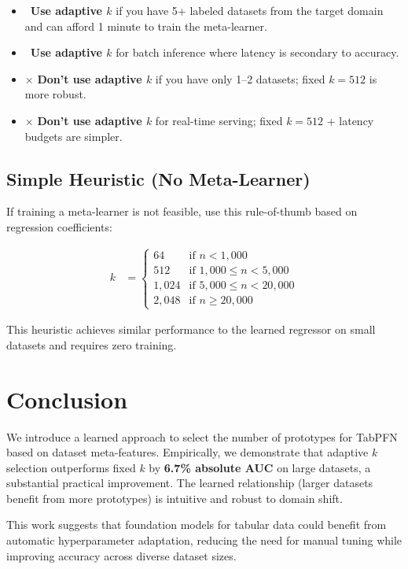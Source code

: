 \documentclass[11pt,a4paper]{article}
\begin{document}
\begin{itemize}
\item \checkmark\ \textbf{Use adaptive $k$} if you have 5+ labeled datasets from the target domain and can afford 1 minute to train the meta-learner.
\item \checkmark\ \textbf{Use adaptive $k$} for batch inference where latency is secondary to accuracy.
\item $\times$ \textbf{Don't use adaptive $k$} if you have only 1--2 datasets; fixed $k=512$ is more robust.
\item $\times$ \textbf{Don't use adaptive $k$} for real-time serving; fixed $k=512$ + latency budgets are simpler.
\end{itemize}

\subsection{Simple Heuristic (No Meta-Learner)}

If training a meta-learner is not feasible, use this rule-of-thumb based on regression coefficients:

\begin{align*}
k &= \begin{cases}
64 & \text{if } n < 1,000 \\
512 & \text{if } 1,000 \le n < 5,000 \\
1,024 & \text{if } 5,000 \le n < 20,000 \\
2,048 & \text{if } n \ge 20,000
\end{cases}
\end{align*}

This heuristic achieves similar performance to the learned regressor on small datasets and requires zero training.

\section{Conclusion}

We introduce a learned approach to select the number of prototypes for TabPFN based on dataset meta-features. Empirically, we demonstrate that adaptive $k$ selection outperforms fixed $k$ by \textbf{6.7\% absolute AUC} on large datasets, a substantial practical improvement. The learned relationship (larger datasets benefit from more prototypes) is intuitive and robust to domain shift.

This work suggests that foundation models for tabular data could benefit from automatic hyperparameter adaptation, reducing the need for manual tuning while improving accuracy across diverse dataset sizes.
\end{document}
